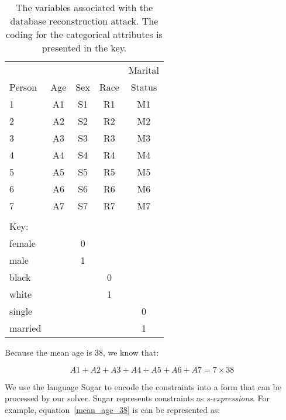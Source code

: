 \documentclass[runningheads]{llncs}
\begin{document}
\begin{table}
\caption{The variables associated with the database reconstruction
  attack. The coding for the categorical attributes is presented in the key.}\label{variables}
\begin{center}
\begin{tabular}{l|cccc}
       &     &     &      & Marital  \\
Person & Age & Sex & Race & Status   \\
\hline                             
1      & A1  & S1  & R1   & M1       \\
2      & A2  & S2  & R2   & M2       \\
3      & A3  & S3  & R3   & M3       \\
4      & A4  & S4  & R4   & M4       \\
5      & A5  & S5  & R5   & M5       \\
6      & A6  & S6  & R6   & M6       \\
7      & A7  & S7  & R7   & M7       \\
\hline
\multicolumn{1}{l}{}\\
\multicolumn{1}{l}{Key:}\\
\hline
female &     &  0  & \\
male   &     &  1  & \\
\hline
black  &     &     &  0   & \\
white  &     &     &  1   & \\
\hline
single &     &     &      &   0\\
married&     &     &      &   1\\
\hline
\end{tabular}
\end{center}
\end{table}

Because the mean age is 38, we know that:

\begin{equation}
A1 + A2 + A3 + A4 + A5 + A6 + A7 = 7 \times 38
\label{mean_age_38}
\end{equation}

We use the language Sugar\cite{sugar} to encode the constraints
into a form that can be processed by our solver. Sugar represents
constraints as
\textit{s-expressions}\cite{McCarthy:1960:RFS:367177.367199}. For
example, equation~\ref{mean_age_38} is can be represented as:
\end{document}
